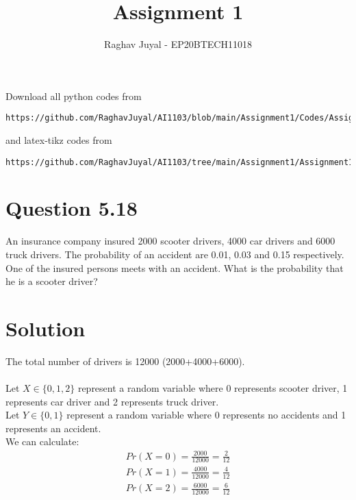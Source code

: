 \documentclass[journal,12pt,twocolumn]{IEEEtran}
\begin{document}
     \def\rightbox#1{\makebox[0in][r]{#1}}
     \def\centbox#1{\makebox[0in]{#1}}
     \def\topbox#1{\raisebox{-\baselineskip}[0in][0in]{#1}}
     \def\midbox#1{\raisebox{-0.5\baselineskip}[0in][0in]{#1}}
\vspace{3cm}
\title{Assignment 1}
\author{Raghav Juyal - EP20BTECH11018}
\maketitle
\newpage
\bigskip
\renewcommand{\thefigure}{\theenumi}
\renewcommand{\thetable}{\theenumi}
Download all python codes from 
\begin{lstlisting}
https://github.com/RaghavJuyal/AI1103/blob/main/Assignment1/Codes/Assignment1.py
\end{lstlisting}
%
and latex-tikz codes from 
%
\begin{lstlisting}
https://github.com/RaghavJuyal/AI1103/tree/main/Assignment1/Assignment1.tex
\end{lstlisting}
\section*{Question 5.18}
An insurance company insured 2000 scooter drivers, 4000 car drivers and 6000 truck drivers. The probability of an accident are 0.01, 0.03 and 0.15 respectively. One of the insured persons meets with an accident. What is the probability that he is a scooter driver?

\section*{Solution}
The total number of drivers is 12000 (2000+4000+6000).\\
\\ Let $X \in \{0,1,2\}$ represent a random variable where 0 represents scooter driver, 1 represents car driver and 2 represents truck driver.
\\ Let $Y \in \{0,1\}$ represent a random variable where 0 represents no accidents and 1 represents an accident.\\
We can calculate:\\
\begin{align}
    Pr(X=0) = \frac{2000}{12000} = \frac{2}{12}\\
    Pr(X=1) = \frac{4000}{12000} = \frac{4}{12}\\
    Pr(X=2) = \frac{6000}{12000} = \frac{6}{12}
\end{align}
\end{document}
